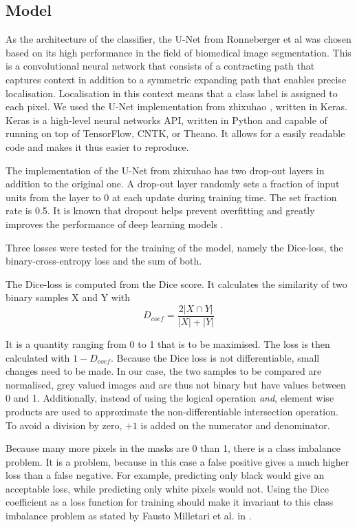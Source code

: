 \subsection{Model}
As the architecture of the classifier, the U-Net from Ronneberger et al \cite{ronneberger_u-net:_2015} was chosen based on its high performance in the field of biomedical image segmentation.
This is a convolutional neural network that consists of a contracting path that captures context in addition to a symmetric expanding path that enables precise localisation.
Localisation in this context means that a class label is assigned to each pixel.
We used the U-Net implementation from zhixuhao \cite{zhixuhao_zhixuhao/unet_2020}, written in Keras.
Keras is a high-level neural networks API, written in Python and capable of running on top of TensorFlow, CNTK, or Theano.
It allows for a easily readable code and makes it thus easier to reproduce.

The implementation of the U-Net from zhixuhao has two drop-out layers in addition to the original one.
A drop-out layer randomly sets a fraction of input units from the layer to 0 at each update during training time.
The set fraction rate is 0.5.
It is known that dropout helps prevent overfitting and greatly improves the performance of deep learning models \cite{srivastava_dropout:_nodate}.

Three losses were tested for the training of the model, namely the Dice-loss, the binary-cross-entropy loss and the sum of both.

The Dice-loss is computed from the Dice score. It calculates the similarity of two binary samples X and Y with
\begin{equation}\label{eqDcoef}
D_{coef} = \frac{2|X\cap Y|}{|X|+|Y|}   
\end{equation}

It is a quantity ranging from 0 to 1 that is to be maximised.
The loss is then calculated with $1-D_{coef}$.
Because the Dice loss is not differentiable, small changes need to be made.
In our case, the two samples to be compared are normalised, grey valued images  and are thus not binary but have values between 0 and 1. 
Additionally, instead of using the logical operation \textit{and}, element wise products are used to approximate the non-differentiable intersection operation.
To avoid a division by zero, $+1$ is added on the numerator and denominator.

Because many more pixels in the masks are 0 than 1, there is a class imbalance problem.
It is a problem, because in this case a false positive gives a much higher loss than a false negative.
For example, predicting only black would give an acceptable loss, while predicting only white pixels would not.
Using the Dice coefficient as a loss function for training should make it invariant to this class imbalance problem as stated by Fausto Milletari et al. in \cite{milletari_v-net:_2016}.

